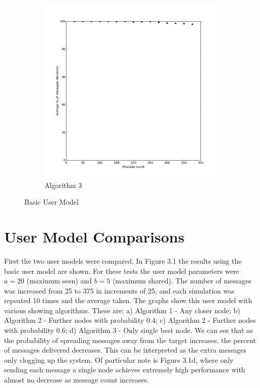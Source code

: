 \documentclass[bsc,frontabs,twoside,singlespacing,parskip,deptreport]{infthesis}     %
\begin{document}
\begin{figure}
\begin{subfigure}[b]{0.3\textwidth}
        \includegraphics[width=\textwidth]{results/BasicShare_OnlyBest}
        \caption{Algorithm 3}
        \label{fig:results/BasicShare_OnlyBest}
    \end{subfigure}
  	\vspace{-5pt}
    \caption{Basic User Model}\label{fig:BasicUserModel}
  	\vspace{-15pt}
\end{figure}

\section{User Model Comparisons}
First the two user models were compared. In Figure 3.1 the results using the basic user model are shown. For these tests the user model parameters were $a = 20$ (maximum seen) and $b = 5$ (maximum shared). The number of messages was increased from 25 to 375 in increments of 25, and each simulation was repeated 10 times and the average taken. The graphs show this user model with various showing algorithms. These are: a) Algorithm 1 - Any closer node; b) Algorithm 2 - Further nodes with probability 0.4; c) Algorithm 2 - Further nodes with probability 0.6; d) Algorithm 3 - Only single best node. We can see that as the probability of spreading messages away from the target increases, the percent of messages delivered decreases. This can be interpreted as the extra messages only clogging up the system. Of particular note is Figure 3.1d, where only sending each message a single node achieves extremely high performance with almost no decrease as message count increases.
\end{document}
